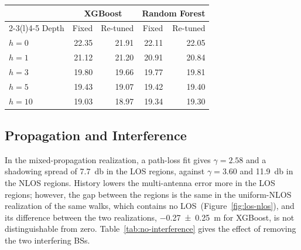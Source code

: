 \par\medskip\noindent\begin{minipage}{\textwidth}
  \centering
  \label{tab:supp-retune}
  \small
  \begin{tabular}{@{}lrrrr@{}}
    \toprule
     & \multicolumn{2}{c}{XGBoost} & \multicolumn{2}{c}{Random Forest} \\
    \cmidrule(lr){2-3}\cmidrule(l){4-5}
    Depth & Fixed & Re-tuned & Fixed & Re-tuned \\
    \midrule
    $h=0$ & 22.35 & 21.91 & 22.11 & 22.05 \\
    $h=1$ & 21.12 & 21.20 & 20.91 & 20.84 \\
    $h=3$ & 19.80 & 19.66 & 19.77 & 19.81 \\
    $h=5$ & 19.43 & 19.07 & 19.42 & 19.40 \\
    $h=10$ & 19.03 & 18.97 & 19.34 & 19.30 \\
    \bottomrule
  \end{tabular}
\end{minipage}\par\medskip

\subsection{Propagation and Interference}
\label{app:propagation}

In the mixed-propagation realization, a path-loss fit gives $\gamma = 2.58$ and a shadowing spread of \SI{7.7}{\decibel} in the LOS regions, against $\gamma = 3.60$ and \SI{11.9}{\decibel} in the NLOS regions. History lowers the multi-antenna error more in the LOS regions; however, the gap between the regions is the same in the uniform-NLOS realization of the same walks, which contains no LOS~(Figure~\ref{fig:los-nlos}), and its difference between the two realizations, \SI{-0.27 +- 0.25}{\meter} for XGBoost, is not distinguishable from zero. Table~\ref{tab:no-interference} gives the effect of removing the two interfering BSs.

